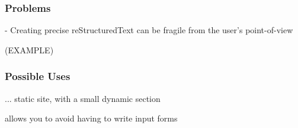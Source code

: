 \documentclass[compress,trans]{beamer}
\begin{document}
\begin{frame}[fragile]
  \frametitle{Problems}

- Creating precise reStructuredText can be fragile from the user's point-of-view

(EXAMPLE)

\end{frame}



\begin{frame}[fragile]
  \frametitle{Possible Uses}

... static site, with a small dynamic section

allows you to avoid having to write input forms

% 



\end{frame}




\end{document}
